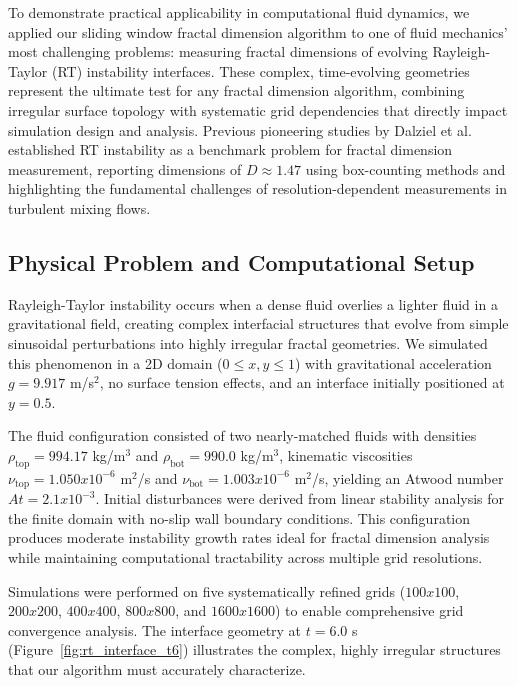 \documentclass[preprint,12pt]{elsarticle}
\def\times{x}%
\begin{document}
To demonstrate practical applicability in computational fluid dynamics, we applied our sliding window fractal dimension algorithm to one of fluid mechanics' most challenging problems: measuring fractal dimensions of evolving Rayleigh-Taylor (RT) instability interfaces. These complex, time-evolving geometries represent the ultimate test for any fractal dimension algorithm, combining irregular surface topology with systematic grid dependencies that directly impact simulation design and analysis. Previous pioneering studies by Dalziel et al.~\cite{dalziel1999} established RT instability as a benchmark problem for fractal dimension measurement, reporting dimensions of $D \approx 1.47$ using box-counting methods and highlighting the fundamental challenges of resolution-dependent measurements in turbulent mixing flows.

\subsection{Physical Problem and Computational Setup}
\label{subsec:rt_setup}

Rayleigh-Taylor instability occurs when a dense fluid overlies a lighter fluid in a gravitational field, creating complex interfacial structures that evolve from simple sinusoidal perturbations into highly irregular fractal geometries. We simulated this phenomenon in a 2D domain ($0 \leq x,y \leq 1$) with gravitational acceleration $g = 9.917$ m/s$^2$, no surface tension effects, and an interface initially positioned at $y = 0.5$.

The fluid configuration consisted of two nearly-matched fluids with densities $\rho_{\text{top}} = 994.17$ kg/m$^3$ and $\rho_{\text{bot}} = 990.0$ kg/m$^3$, kinematic viscosities $\nu_{\text{top}} = 1.050 \times 10^{-6}$ m$^2$/s and $\nu_{\text{bot}} = 1.003 \times 10^{-6}$ m$^2$/s, yielding an Atwood number $At = 2.1 \times 10^{-3}$. Initial disturbances were derived from linear stability analysis for the finite domain with no-slip wall boundary conditions. This configuration produces moderate instability growth rates ideal for fractal dimension analysis while maintaining computational tractability across multiple grid resolutions.

Simulations were performed on five systematically refined grids ($100 \times 100$, $200 \times 200$, $400 \times 400$, $800 \times 800$, and $1600 \times 1600$) to enable comprehensive grid convergence analysis. The interface geometry at $t = 6.0$ s (Figure~\ref{fig:rt_interface_t6}) illustrates the complex, highly irregular structures that our algorithm must accurately characterize.
\end{document}
